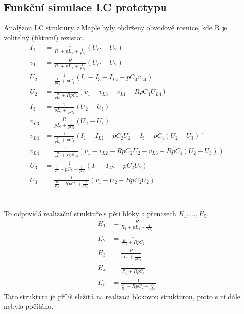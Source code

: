 \subsection{Funkční simulace LC prototypu}\label{s:KASK}
\noindent Analýzou LC struktury z Maple byly obdrženy obvodové rovnice, kde R je volitelný (fiktivní) rezistor.
\begin{align}
I_1 &= \frac{1}{R_1 + pL_1 + \frac{1}{pC_1}}(U_G - U_2)\\
v_1 & = \frac{R}{R_1 + pL_1 + \frac{1}{pC_1}}(U_G - U_2)\\
U_2 &= \frac{1}{\frac{1}{pL_2} + pC_2}(I_1 - I_{3} - I_{L4} - pC_4 v_{L4})\\
U_2 &= \frac{1}{\frac{R}{pL_2} + RpC_2}(v_1 - v_{L3} - v_{L4} - RpC_4 U_{L4})\\
I_{3} &= \frac{1}{pL_3 + \frac{1}{pC_3}}(U_2 - U_3)\\
v_{L3} &= \frac{R}{pL_3 + \frac{1}{pC_3}}(U_2 - U_3)\\
v_{L4} &= \frac{1}{\frac{1}{pL_4}+pC_4}(I_1 - I_{L2} - pC_2U_2 - I_{3} - pC_4 (U_2 - U_3))\\
v_{L4} &= \frac{1}{\frac{R}{pL_4}+RpC_4}(v_1 - v_{L2} - RpC_2U_2 - v_{L3} - RpC_4 (U_2 - U_3))\\
U_3 &= \frac{1}{\frac{1}{R_z}+pC_5 + \frac{1}{pL_5}}(I_1 - I_{L2} - pC_2U_2)\\
U_3 &= \frac{1}{\frac{R}{R_z}+RpC_5 + \frac{R}{pL_5}}(v_1 - U_2 - RpC_2 U_2)
\end{align}
\\
\\
\noindent To odpovídá realizační struktuře s pěti bloky o přenosech $H_1, \ldots,H_5$.
\begin{align}
H_1 & = \frac{R}{R_1 + pL_1 + \frac{1}{pC_1}}\\
H_2 &= \frac{1}{\frac{R}{pL_2} + RpC_2}\\
H_3 &= \frac{R}{pL_3 + \frac{1}{pC_3}}\\
H_4 &= \frac{1}{\frac{R}{pL_4}+RpC_4}\\
H_5 &= \frac{1}{\frac{R}{R_z}+RpC_5 + \frac{R}{pL_5}}
\end{align}
\noindent Tato struktura je příliš složitá na realizaci blokovou strukturou, proto s ní dále nebylo počítáno. 

